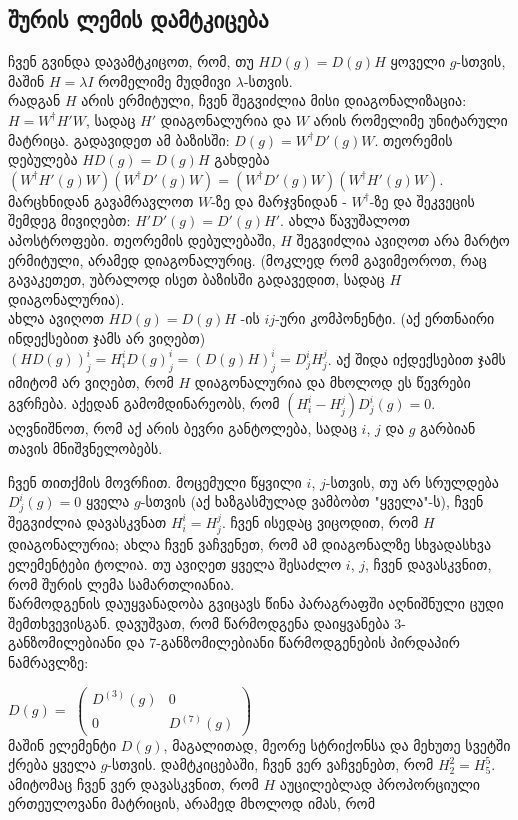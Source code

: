 \documentclass[12pt]{article}
\begin{document}
\begin{sloppypar}
\subsection{შურის ლემის დამტკიცება}

ჩვენ გვინდა დავამტკიცოთ, რომ, თუ $HD(g)=D(g)H$ ყოველი $g$-სთვის, მაშინ $H = \lambda I$ რომელიმე მუდმივი $\lambda$-სთვის.\\

რადგან $H$ არის ერმიტული, ჩვენ შეგვიძლია მისი დიაგონალიზაცია: $H=W^{\dagger}H'W$, სადაც $H'$ დიაგონალურია და $W$ არის რომელიმე უნიტარული მატრიცა. გადავიდეთ ამ ბაზისში: $D(g)=W^{\dagger}D'(g)W$. თეორემის დებულება $HD(g)=D(g)H$ გახდება 
$(W^{\dagger}H'(g)W)(W^{\dagger}D'(g)W) = (W^{\dagger}D'(g)W)(W^{\dagger}H'(g)W)$.
მარცხნიდან გავამრავლოთ $W$-ზე და მარჯვნიდან - $W^{\dagger}$-ზე და შეკვეცის შემდეგ მივიღებთ: 
$H'D'(g)=D'(g)H'$. ახლა წავუშალოთ აპოსტროფები. თეორემის დებულებაში, $H$ შეგვიძლია ავიღოთ არა მარტო ერმიტული, არამედ დიაგონალურიც. (მოკლედ რომ გავიმეოროთ, რაც გავაკეთეთ, უბრალოდ ისეთ ბაზისში გადავედით, სადაც $H$ დიაგონალურია).\\

ახლა ავიღოთ $HD(g)=D(g)H$ -ის $ij$-ური კომპონენტი. (აქ ერთნაირი ინდექსებით ჯამს არ ვიღებთ) 
$(HD(g))^i_j = H^i_iD(g)^i_j = (D(g)H)^i_j = D^i_jH^j_j$. 
აქ შიდა იქდექსებით ჯამს იმიტომ არ ვიღებთ, რომ $H$ დიაგონალურია და მხოლოდ ეს წევრები გვრჩება. აქედან გამომდინარეობს, რომ 
$(H^i_i-H^j_j)D^i_j(g) = 0$.
აღვნიშნოთ, რომ აქ არის ბევრი განტოლება, სადაც $i$, $j$ და $g$ გარბიან თავის მნიშვნელობებს.

ჩვენ თითქმის მოვრჩით. მოცემული წყვილი $i$, $j$-სთვის, თუ არ სრულდება $D^i_j(g)=0$ ყველა $g$-სთვის (აქ ხაზგასმულად ვამბობთ "ყველა"-ს), ჩვენ შეგვიძლია დავასკვნათ $H^i_i=H^j_j$. ჩვენ ისედაც ვიცოდით, რომ $H$ დიაგონალურია; ახლა ჩვენ ვაჩვენეთ, რომ ამ დიაგონალზე სხვადასხვა ელემენტები ტოლია.
თუ ავიღეთ ყველა შესაძლო $i$, $j$, ჩვენ დავასკვნით, რომ შურის ლემა სამართლიანია.\\

წარმოდგენის დაუყვანადობა გვიცავს წინა პარაგრაფში აღნიშნული ცუდი შემთხვევისგან. დავუშვათ, რომ წარმოდგენა დაიყვანება 3-განზომილებიანი და 7-განზომილებიანი წარმოდგენების პირდაპირ ნამრავლზე:

$D(g) = $
$
\begin{pmatrix}
D^{(3)}(g) & 0\\
0 & D^{(7)}(g)
\end{pmatrix}
$ \\

მაშინ ელემენტი $D(g)$, მაგალითად, მეორე სტრიქონსა და მეხუთე სვეტში ქრება ყველა $g$-სთვის. დამტკიცებაში, ჩვენ ვერ ვაჩვენებთ, რომ $H^2_2=H^5_5$. ამიტომაც ჩვენ ვერ დავასკვნით, რომ $H$ აუცილებლად პროპორციული ერთეულოვანი მატრიცის, არამედ მხოლოდ იმას, რომ



\end{sloppypar}
\end{document}
